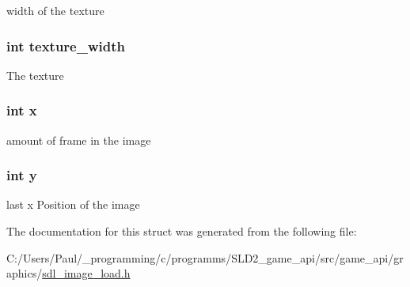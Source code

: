 width of the texture \hypertarget{struct___image_ae4f71de45f0a2263d14930dcf8691f5d}{
\subsubsection[{texture\+\_\+width}]{\setlength{\rightskip}{0pt plus 5cm}int texture\+\_\+width}}\label{struct___image_ae4f71de45f0a2263d14930dcf8691f5d}
The texture \hypertarget{struct___image_a6150e0515f7202e2fb518f7206ed97dc}{
\subsubsection[{x}]{\setlength{\rightskip}{0pt plus 5cm}int x}}\label{struct___image_a6150e0515f7202e2fb518f7206ed97dc}
amount of frame in the image \hypertarget{struct___image_a0a2f84ed7838f07779ae24c5a9086d33}{
\subsubsection[{y}]{\setlength{\rightskip}{0pt plus 5cm}int y}}\label{struct___image_a0a2f84ed7838f07779ae24c5a9086d33}
last x Position of the image 

The documentation for this struct was generated from the following file\+:\begin{DoxyCompactItemize}
\item 
C\+:/\+Users/\+Paul/\+\_\+programming/c/programms/\+S\+L\+D2\+\_\+game\+\_\+api/src/game\+\_\+api/graphics/\hyperlink{sdl__image__load_8h}{sdl\+\_\+image\+\_\+load.\+h}\end{DoxyCompactItemize}
